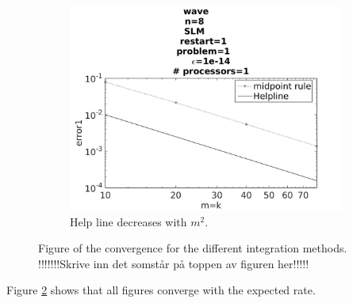 \begin{figure}[H]
\begin{subfigure}[b]{0.30\textwidth}
        \end{subfigure}
        \begin{subfigure}[b]{0.30\textwidth}
                \includegraphics[width=\textwidth]{../MATLAB/fig/intconvmid.jpg}
                \caption{ Help line decreases with $m^2$. }
                \label{fig:intconvmid}
        \end{subfigure}
        \caption{Figure of the convergence for the different integration methods. !!!!!!!Skrive inn det somstår på toppen av figuren her!!!!! }
        \label{fig:intconv}
\end{figure}
Figure \ref{fig:intconv} shows that all figures converge with the expected rate.

